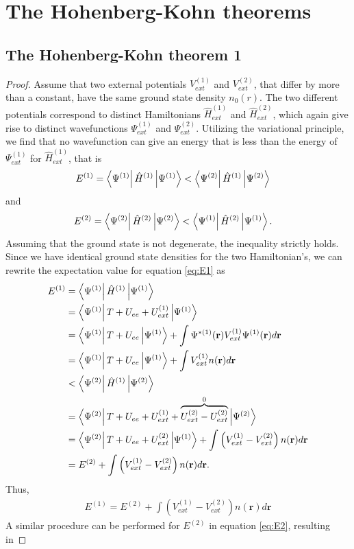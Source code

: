 \section{The Hohenberg-Kohn theorems}

\subsection{The Hohenberg-Kohn theorem 1}
\label{appendix:theorem1}

\begin{proof}
  Assume that two external potentials $V_{ext}^{(1)}$ and $V_{ext}^{(2)}$, that differ by more than a constant, have the same ground state density $n_0(r)$. The two different potentials correspond to distinct Hamiltonians $\hat{H}_{ext}^{(1)}$ and $\hat{H}_{ext}^{(2)}$, which again give rise to distinct wavefunctions $\Psi_{ext}^{(1)}$ and $\Psi_{ext}^{(2)}$. Utilizing the variational principle, we find that no wavefunction can give an energy that is less than the energy of $\Psi_{ext}^{(1)}$ for $\hat{H}_{ext}^{(1)}$, that is
  \begin{align}
    E^{(1)} = \bra{\Psi^{(1)}}\hat{H}^{(1)}\ket{\Psi^{(1)}} &< \bra{\Psi^{(2)}}\hat{H}^{(1)}\ket{\Psi^{(2)}} \label{eq:E1}
  \end{align}
  and
  \begin{align}
    E^{(2)} = \bra{\Psi^{(2)}}\hat{H}^{(2)}\ket{\Psi^{(2)}} &< \bra{\Psi^{(1)}}\hat{H}^{(2)}\ket{\Psi^{(1)}}.
    \label{eq:E2}
  \end{align}
  Assuming that the ground state is not degenerate, the inequality strictly holds. Since we have identical ground state densities for the two Hamiltonian's, we can rewrite the expectation value for equation \ref{eq:E1} as
  \begin{align*}
    E^{(1)} &= \bra{\Psi^{(1)}}\hat{H}^{(1)}\ket{\Psi^{(1)}} \\
    &= \bra{\Psi^{(1)}}T + U_{ee} + U_{ext}^{(1)}\ket{\Psi^{(1)}} \\
    &= \bra{\Psi^{(1)}} T + U_{ee} \ket{\Psi^{(1)}} + \int \Psi^{*(1)}(\textbf{r})V_{ext}^{(1)}\Psi^{(1)}(\textbf{r})d\textbf{r} \\
    &= \bra{\Psi^{(1)}} T + U_{ee} \ket{\Psi^{(1)}} + \int V_{ext}^{(1)} n(\textbf{r})d\textbf{r} \\
    &< \bra{\Psi^{(2)}}\hat{H}^{(1)}\ket{\Psi^{(2)}} \\
    &= \bra{\Psi^{(2)}} T + U_{ee} + U_{ext}^{(1)} + \overbrace{U_{ext}^{(2)} - U_{ext}^{(2)} }^{0} \ket{\Psi^{(2)}}\\
    &= \bra{\Psi^{(2)}} T + U_{ee} + U_{ext}^{(2)}\ket{\Psi^{(1)}} + \int \left(V_{ext}^{(1)} - V_{ext}^{(2)}\right) n(\textbf{r})d\textbf{r} \\
    &= E^{(2)} + \int \left(V_{ext}^{(1)} - V_{ext}^{(2)}\right) n(\textbf{r})d\textbf{r}.
  \end{align*}
Thus,
\begin{align}
  E^{(1)} = E^{(2)} + \int \left(V_{ext}^{(1)} - V_{ext}^{(2)}\right) n(\textbf{r})d\textbf{r}
\end{align}
A similar procedure can be performed for $E^{(2)}$ in equation \ref{eq:E2}, resulting in


\end{proof}
